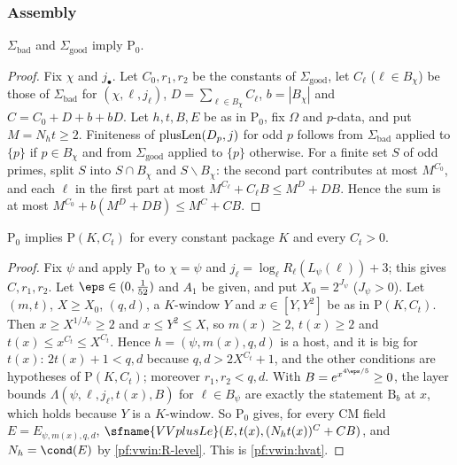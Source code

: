 \subsubsection{Assembly}

\begin{proposition}\label{pf:vwin:point}
$\Sigma_{\mathrm{bad}}$ and $\Sigma_{\mathrm{good}}$ imply $\mathrm{P}_0$.
\end{proposition}

\begin{proof}
Fix $\chi$ and $j_\bullet$. Let $C_0,r_1,r_2$ be the constants of $\Sigma_{\mathrm{good}}$, let $C_\ell$ ($\ell\in B_\chi$) be those
of $\Sigma_{\mathrm{bad}}$ for $(\chi,\ell,j_\ell)$, $D=\sum_{\ell\in B_\chi}C_\ell$, $b=|B_\chi|$ and $C=C_0+D+b+bD$. Let $h,t,B,E$ be as
in $\mathrm{P}_0$, fix $\Omega$ and $p$-data, and put $M=N_ht\ge2$. Finiteness of $\mathrm{plusLen}(D_p,j)$ for odd $p$ follows from
$\Sigma_{\mathrm{bad}}$ applied to $\{p\}$ if $p\in B_\chi$ and from $\Sigma_{\mathrm{good}}$ applied to $\{p\}$ otherwise. For a finite
set $S$ of odd primes, split $S$ into $S\cap B_\chi$ and $S\smallsetminus B_\chi$: the second part contributes at most $M^{C_0}$,
and each $\ell$ in the first part at most $M^{C_\ell}+C_\ell B\le M^D+DB$. Hence the sum is at most
$M^{C_0}+b(M^D+DB)\le M^C+CB$.
\end{proof}

\begin{proposition}\label{pf:vwin:thmhv}
$\mathrm{P}_0$ implies $\mathrm{P}(K,C_t)$ for every constant package $K$ and every $C_t>0$.
\end{proposition}

\begin{proof}
Fix $\psi$ and apply $\mathrm{P}_0$ to $\chi=\psi$ and $j_\ell=\log_\ell R_\ell(L_\psi(\ell))+3$; this gives $C,r_1,r_2$. Let
$\eps\in(0,\frac1{52})$ and $A_1$ be given, and put $X_0=2^{J_\psi}$ ($J_\psi>0$). Let $(m,t)$, $X\ge X_0$, $(q,d)$, a $K$-window
$Y$ and $x\in[Y,Y^2]$ be as in $\mathrm{P}(K,C_t)$. Then $x\ge X^{1/J_\psi}\ge2$ and $x\le Y^2\le X$, so $m(x)\ge2$, $t(x)\ge2$ and
$t(x)\le x^{C_t}\le X^{C_t}$. Hence $h=(\psi,m(x),q,d)$ is a host, and it is big for $t(x)$: $2t(x)+1<q,d$ because
$q,d>2X^{C_t}+1$, and the other conditions are hypotheses of $\mathrm{P}(K,C_t)$; moreover $r_1,r_2<q,d$. With
$B=e^{x^{4\eps/5}}\ge0$, the layer bounds $\Lambda(\psi,\ell,j_\ell,t(x),B)$ for $\ell\in B_\psi$ are exactly the statement
$\mathrm{B}_b$ at $x$, which holds because $Y$ is a $K$-window. So $\mathrm{P}_0$ gives, for every CM field
$E=E_{\psi,m(x),q,d}$, $\sfname{VVplusLe}(E,t(x),(N_ht(x))^C+CB)$, and $N_h=\cond(E)$ by \ref{pf:vwin:R-level}. This is
\eqref{pf:vwin:hvat}.
\end{proof}

